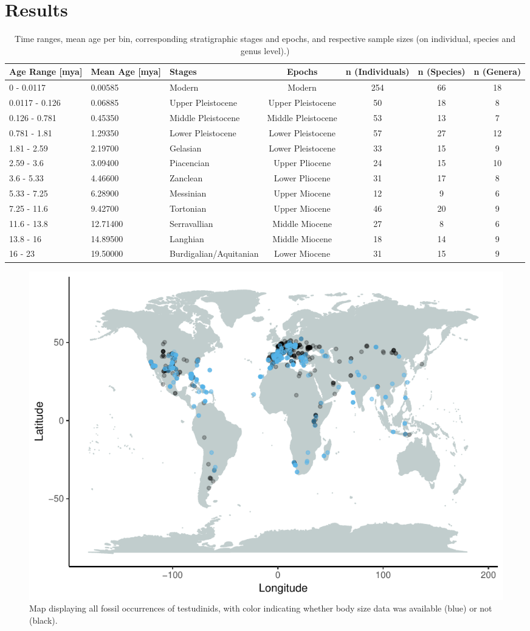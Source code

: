\section{Results}

\begin{landscape}\label{data}
\begin{longtable}[]{@{}lllcccc@{}}
	\caption[Sample sizes per time bins]{Time ranges, mean age per bin, corresponding stratigraphic stages and epochs, and respective sample sizes (on individual, species and genus level).)}
	\label{tab:bins}\tabularnewline
	\toprule
	Age Range [mya] & Mean Age [mya] & Stages & Epochs & n (Individuals) & n (Species) & n (Genera)\tabularnewline
	\midrule
	\endhead
	0 - 0.0117 & 0.00585 & Modern & Modern & 254 & 66 & 18\tabularnewline
	0.0117 - 0.126 & 0.06885 & Upper Pleistocene & Upper Pleistocene & 50
	& 18 & 8\tabularnewline
	0.126 - 0.781 & 0.45350 & Middle Pleistocene & Middle Pleistocene & 53
	& 13 & 7\tabularnewline
	0.781 - 1.81 & 1.29350 & Lower Pleistocene & Lower Pleistocene & 57 &
	27 & 12\tabularnewline
	1.81 - 2.59 & 2.19700 & Gelasian & Lower Pleistocene & 33 & 15 &
	9\tabularnewline
	2.59 - 3.6 & 3.09400 & Piacencian & Upper Pliocene & 24 & 15 &
	10\tabularnewline
	3.6 - 5.33 & 4.46600 & Zanclean & Lower Pliocene & 31 & 17 &
	8\tabularnewline
	5.33 - 7.25 & 6.28900 & Messinian & Upper Miocene & 12 & 9 &
	6\tabularnewline
	7.25 - 11.6 & 9.42700 & Tortonian & Upper Miocene & 46 & 20 &
	9\tabularnewline
	11.6 - 13.8 & 12.71400 & Serravallian & Middle Miocene & 27 & 8 &
	6\tabularnewline
	13.8 - 16 & 14.89500 & Langhian & Middle Miocene & 18 & 14 &
	9\tabularnewline
	16 - 23 & 19.50000 & Burdigalian/Aquitanian & Lower Miocene & 31 & 15 & 9\tabularnewline
	\bottomrule
\end{longtable}
\end{landscape}


\FloatBarrier

\begin{figure}[htbp]
	\centering
	\includegraphics[width=\textwidth]{MA_JJ_files/figure-latex/MapFossilOccurrences-1.pdf}
	\caption[Map: fossil occurences]{Map displaying all fossil occurrences of testudinids, with
		color indicating whether body size data was available (blue) or not (black).}
\end{figure}



